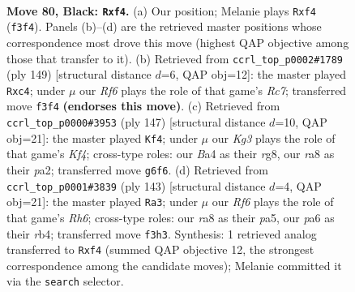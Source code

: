 \documentclass[11pt]{article}
\begin{document}
\clearpage

\begin{figure}[p]\centering
\begin{subfigure}{0.46\textwidth}\centering
\resizebox{\linewidth}{!}{%
\newchessgame
\chessboard[
  setfen={R7/8/P5k1/5p2/b4P2/5r2/8/7K b - - 2 80},
  showmover=false,
  pgfstyle=straightmove, color=movearrow, markmove={f3-f4}
]}
\caption{}
\end{subfigure}\hfill
\begin{subfigure}{0.46\textwidth}\centering
\resizebox{\linewidth}{!}{%
\newchessgame
\chessboard[
  setfen={8/8/8/R7/2P3k1/P5p1/2r5/5K2 b - - 7 75},
  showmover=false,
  pgfstyle=straightmove, color=movearrow, markmove={c2-c4}
]}
\caption{}
\end{subfigure}
\\[4pt]
\begin{subfigure}{0.46\textwidth}\centering
\resizebox{\linewidth}{!}{%
\newchessgame
\chessboard[
  setfen={6R1/8/8/5k2/4p2P/1P5r/P7/4K3 b - - 2 74},
  showmover=false,
  pgfstyle=straightmove, color=movearrow, markmove={f5-f4}
]}
\caption{}
\end{subfigure}\hfill
\begin{subfigure}{0.46\textwidth}\centering
\resizebox{\linewidth}{!}{%
\newchessgame
\chessboard[
  setfen={8/8/5k2/P4p2/1R5P/7r/3K4/8 b - - 0 72},
  showmover=false,
  pgfstyle=straightmove, color=movearrow, markmove={h3-a3}
]}
\caption{}
\end{subfigure}
\caption{\textbf{Move 80, Black: \texttt{Rxf4}.} (a) Our position; Melanie plays \texttt{Rxf4} (\texttt{f3f4}). Panels (b)--(d) are the retrieved master positions whose correspondence most drove this move (highest QAP objective among those that transfer to it). (b) Retrieved from \texttt{ccrl\_top\_p0002\#1789} (ply 149) [structural distance $d$=6, QAP obj=12]: the master played \texttt{Rxc4}; under $\mu$ our \emph{Rf6} plays the role of that game's \emph{Rc7}; transferred move \texttt{f3f4} \textbf{(endorses this move)}. (c) Retrieved from \texttt{ccrl\_top\_p0000\#3953} (ply 147) [structural distance $d$=10, QAP obj=21]: the master played \texttt{Kf4}; under $\mu$ our \emph{Kg3} plays the role of that game's \emph{Kf4}; cross-type roles: our \emph{B}a4 as their \emph{r}g8, our \emph{r}a8 as their \emph{p}a2; transferred move \texttt{g6f6}. (d) Retrieved from \texttt{ccrl\_top\_p0001\#3839} (ply 143) [structural distance $d$=4, QAP obj=21]: the master played \texttt{Ra3}; under $\mu$ our \emph{Rf6} plays the role of that game's \emph{Rh6}; cross-type roles: our \emph{r}a8 as their \emph{p}a5, our \emph{p}a6 as their \emph{r}b4; transferred move \texttt{f3h3}. Synthesis: 1 retrieved analog transferred to \texttt{Rxf4} (summed QAP objective 12, the strongest correspondence among the candidate moves); Melanie committed it via the \texttt{search} selector.}
\label{fig:thought-m159}
\end{figure}
\end{document}
